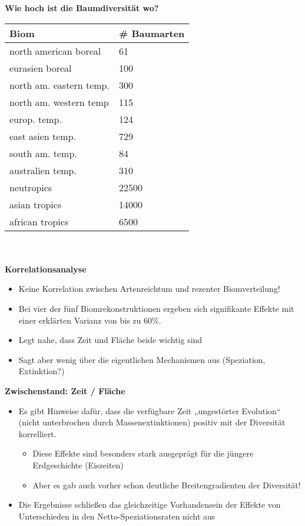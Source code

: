 \textbf{Wie hoch ist die Baumdiversität wo?}\\
\begin{tabularx}{0.5\textwidth}{p{}|p{}}
Biom & \# Baumarten\\
\hline
north american boreal & 61 \\
eurasien boreal & 100 \\
north am. eastern temp. & 300 \\
north am. western temp & 115 \\
europ. temp. & 124 \\
east asien temp. & 729 \\
south am. temp. & 84 \\
australien temp. & 310 \\
neutropics & 22500 \\
asian tropics & 14000 \\
african tropics & 6500 \\
\end{tabularx}
\\\\
\textbf{Korrelationsanalyse}
\begin{itemize}
	\item Keine Korrelation zwischen Artenreichtum und rezenter Biomverteilung!
	\item Bei vier der fünf Biomrekonstruktionen ergeben sich signifikante Effekte mit einer erklärten Varianz von bis zu 60\%.
	\item Legt nahe, dass Zeit und Fläche beide wichtig sind
	\item Sagt aber wenig über die eigentlichen Mechanismen aus (Speziation, Extinktion?)
\end{itemize}

\textbf{Zwischenstand: Zeit / Fläche}
\begin{itemize}
	\item Es gibt Hinweise dafür, dass die verfügbare Zeit „ungestörter Evolution“ (nicht unterbrochen durch Massenextinktionen) positiv mit der Diversität korrelliert.
	\begin{itemize}
		\item Diese Effekte sind besonders stark ausgeprägt für die jüngere Erdgeschichte (Eiszeiten)
		\item Aber es gab auch vorher schon deutliche Breitengradienten der Diversität!
	\end{itemize}
	\item Die Ergebnisse schließen das gleichzeitige Vorhandensein der Effekte von Unterschieden in den Netto-Speziationsraten nicht aus
\end{itemize}

